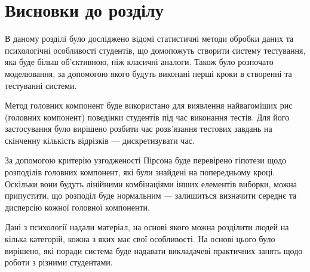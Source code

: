 \chapter*{Висновки до розділу }

В даному розділі було досліджено відомі статистичні методи обробки даних
та психологічні особливості студентів, що домопожуть створити систему
тестування, яка буде більш об’єктивною, ніж класичні аналоги.
Також було розпочато моделювання, за допомогою якого будуть виконані
перші кроки в створенні та тестуванні системи.

Метод головних компонент буде використано для виявлення найвагоміших
рис (головних компонент) поведінки студентів під час виконання тестів.
Для його застосування було вирішено розбити час розв’язання тестових завдань
на скінченну кількість відрізків --- дискретизувати час.

За допомогою критерію узгодженості Пірсона буде перевірено гіпотези щодо
розподілів головних компонент, які були знайдені на попередньому кроці.
Оскільки вони будуть лінійними комбінаціями інших елементів виборки, можна
припустити, що розподіл буде нормальним --- залишиться визначити середнє
та дисперсію кожної головної компоненти.

Дані з психології надали матеріал, на основі якого можна розділити людей
на кілька категорій, кожна з яких має свої особливості.
На основі цього було вирішено, які поради система буде надавати викладачеві
практичних занять щодо роботи з різними студентами.
